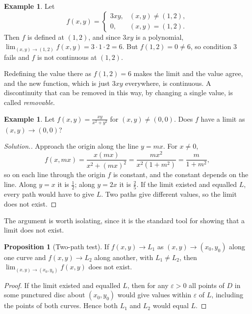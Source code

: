 \documentclass[11pt,a4paper]{article}
\theoremstyle{definition}
\newtheorem{exa}[thm]{Example}
\newtheorem{prop}[thm]{Proposition}
\newenvironment{solution}
  {\renewcommand{\qedsymbol}{}\begin{proof}[\textit{Solution}.]}
  {\end{proof}}
\begin{document}
\begin{exa}
\label{ex:removable}
Let
\[f(x,y) =
\begin{cases}
3xy, & (x,y) \neq (1,2),\\
0, & (x,y) = (1,2).
\end{cases}\]
Then $f$ is defined at $(1,2)$, and since $3xy$ is a polynomial,
$\lim_{(x,y)\to (1,2)}f(x,y) = 3\cdot 1\cdot 2 = 6$. But $f(1,2) = 0\neq 6$, so
condition 3 fails and $f$ is not continuous at $(1,2)$.

Redefining the value there as $f(1,2) = 6$ makes the limit and the value agree,
and the new function, which is just $3xy$ everywhere, is continuous. A
discontinuity that can be removed in this way, by changing a single value, is
called \emph{removable}.
\end{exa}

\begin{exa}
\label{ex:nolimit}
Let $f(x,y) = \frac{xy}{x^2 + y^2}$ for $(x,y) \neq (0,0)$. Does $f$ have a limit
as $(x,y) \to (0,0)$?
\end{exa}

\begin{solution}
Approach the origin along the line $y = mx$. For $x\neq 0$,
\[f(x,mx) = \frac{x(mx)}{x^2 + (mx)^2} = \frac{m x^2}{x^2(1 +m^2)} =
\frac{m}{1 + m^2},\]
so on each line through the origin $f$ is constant, and the constant depends on
the line. Along $y = x$ it is $\frac{1}{2}$; along $y = 2x$ it is $\frac{2}{5}$.
If the limit existed and equalled $L$, every path would have to give $L$. Two
paths give different values, so the limit does not exist.
\end{solution}

The argument is worth isolating, since it is the standard tool for showing that
a limit does not exist.

\begin{prop}[Two-path test]
\label{prop:twopath}
If $f(x,y)\to L_1$ as $(x,y)\to(x_0,y_0)$ along one curve and $f(x,y)\to L_2$
along another, with $L_1\neq L_2$, then
$\lim_{(x,y)\to(x_0,y_0)} f(x,y)$ does not exist.
\end{prop}

\begin{proof}
If the limit existed and equalled $L$, then for any $\varepsilon>0$ all points of
$D$ in some punctured disc about $(x_0,y_0)$ would give values within
$\varepsilon$ of $L$, including the points of both curves. Hence both $L_1$ and
$L_2$ would equal $L$.
\end{proof}
\end{document}
